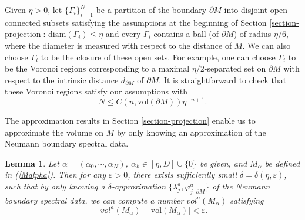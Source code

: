 \documentclass[11pt,letterpaper]{amsart}
\numberwithin{equation}{section}
\theoremstyle{definition}
\theoremstyle{plain}
\theoremstyle{definition}
\theoremstyle{plain}
\newtheorem{volume}{Lemma}[section]
\theoremstyle{definition}
\theoremstyle{plain}
\newcommand{\vol}{\textrm{vol}}
\begin{document}
\medskip
Given $\eta>0$, let $\{\Gamma_i\}_{i=1}^N$ be a partition of the boundary $\partial M$ into disjoint open connected subsets satisfying the assumptions at the beginning of Section \ref{section-projection}: $\textrm{diam}(\Gamma_i)\leqslant \eta$ and every $\Gamma_i$ contains a ball (of $\partial M$) of radius $\eta/6$, where the diameter is measured with respect to the distance of $M$. We can also choose $\Gamma_i$ to be the closure of these open sets. For example, one can choose $\Gamma_i$ to be the Voronoi regions corresponding to a maximal $\eta/2$-separated set on $\partial M$ with respect to the intrinsic distance $d_{\partial M}$ of $\partial M$. It is straightforward to check that these Voronoi regions satisfy our assumptions with 
\begin{equation}\label{boundN}
N\leqslant C(n,\vol(\partial M))\eta^{-n+1}.
\end{equation}

The approximation results in Section \ref{section-projection} enable us to approximate the volume on $M$ by only knowing an approximation of the Neumann boundary spectral data.

\begin{volume}\label{volume}
Let $\alpha=(\alpha_0,\cdots,\alpha_N)$, $\alpha_k\in [\eta, D]\cup\{0\}$ be given, and $M_{\alpha}$ be defined in (\ref{Malpha}). Then for any $\varepsilon>0$, there exists sufficiently small $\delta=\delta(\eta,\varepsilon)$, such that by only knowing a $\delta$-approximation $\{\lambda^a_j,\varphi^a_j|_{\partial M}\}$ of the Neumann boundary spectral data, we can compute a number $vol^{a}(M_{\alpha})$ satisfying 
$$\big|vol^{a}(M_{\alpha})-\vol(M_{\alpha}) \big|<\varepsilon.$$
\end{volume}
\end{document}
